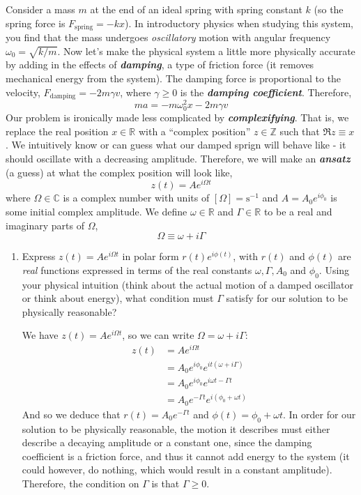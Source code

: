 \documentclass[10pt]{article}
\begin{document}
	 Consider a mass $m$ at the end of an ideal spring with spring constant $k$ (so the spring force is 
	 $F_{\text{spring}} = -kx$). In introductory physics when studying this system, you find that the mass
	 undergoes \textit{oscillatory} motion with angular frequency $\omega_0 = \sqrt{k/m}$. Now let's make 
	 the physical system a little more physically accurate by adding in the effects of \textbf{\textit{damping}},
	 a type of friction force (it removes mechanical energy from the system). The damping force is proportional
	 to the velocity, $F_{\text{damping}} = -2 m \gamma v$, where $\gamma \ge 0$ is the 
	 \textbf{\textit{damping coefficient}}. Therefore, 
	 \[
	 ma = -m\omega_0^2 x - 2m \gamma v
	 \] 
	 Our problem is ironically made less complicated by \textit{\textbf{complexifying}}. That is, we replace the
	 real position $x \in \mathbb R$ with a ``complex position'' $z \in \mathbb Z$ such that $\Re z \equiv x$. We
	 intuitively know or can guess what our damped sprign will behave like - it should oscillate with a 
	 decreasing amplitude. Therefore, we will make an \textbf{\textit{ansatz}} (a guess) at what the complex
	 position will look like, 
	 \[
		 z(t) = Ae^{i \Omega t} 
	 \] 
	 where $\Omega \in \mathbb C$ is a complex number with units of $[\Omega] = \mathrm s^{-1}$ and $A = A_0 
	 e^{i \phi_0}$ is some initial complex amplitude. We define $\omega \in \mathbb R$ and $\Gamma \in \mathbb R$
	 to be a real and imaginary parts of $\Omega$, 
	 \[
	 \Omega \equiv \omega + i \Gamma
	 \] 
	 \begin{enumerate}[label=\alph*)]
		 \item Express $z(t) = Ae^{i \Omega t}$ in polar form $r(t) e^{i \phi(t)}$, with $r(t)$ and $\phi(t)$ 
			 are \textit{real} functions expressed in terms of the real constants $\omega, \Gamma, A_0$ and 
			 $\phi_0$. Using your physical intuition (think about the actual motion of a damped oscillator
			 or think about energy), what condition must $\Gamma$ satisfy for our solution to be physically 
			 reasonable?

			 \begin{solution}
				 We have $z(t) = Ae^{i \Omega t}$, so we can write $\Omega = \omega + i \Gamma$:
				 \begin{align*}
					 z(t) &= Ae^{i \Omega t}\\
						  &= A_0e^{i \phi_0} e^{it(\omega + i \Gamma)} \\
						  &= A_0e^{i \phi_0}e^{i \omega t - \Gamma t} \\
						  &= A_0e^{-\Gamma t} e^{i(\phi_0 + \omega t)}
				 \end{align*}
				 And so we deduce that $r(t) = A_0e^{-\Gamma t}$ and $\phi(t) = \phi_0 + \omega t$. In order
				 for our solution to be physically reasonable, the motion it describes must either describe
				 a decaying amplitude or a constant one, since the damping coefficient is a friction force, and 
				 thus it cannot add energy to the system (it could however, do nothing, which would result 
				 in a constant amplitude). Therefore, the condition on $\Gamma$ is that 
				 $\Gamma \ge 0$. 
			 \end{solution}
	 \end{enumerate}
\end{document}
